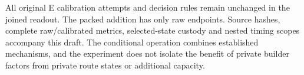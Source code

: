 All original E calibration attempts and decision rules remain unchanged in the joined readout. The packed addition has only raw endpoints. Source hashes, complete raw/calibrated metrics, selected-state custody and nested timing scopes accompany this draft. The conditional operation combines established mechanisms, and the experiment does not isolate the benefit of private builder factors from private route states or additional capacity.

